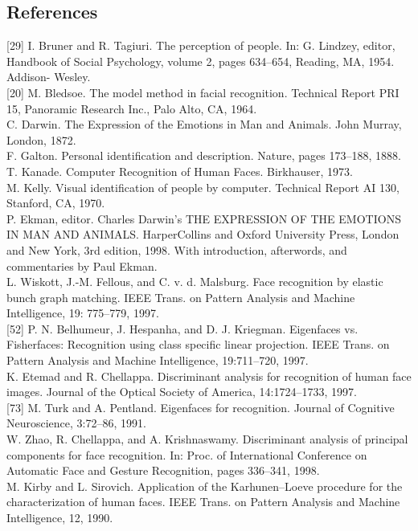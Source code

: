\documentclass[10pt,a4paper]{article}
\begin{document}
\subsection{References}
[29] I. Bruner and R. Tagiuri. The perception of people. In: G. Lindzey, editor, Handbook
of Social Psychology, volume 2, pages 634–654, Reading, MA, 1954. Addison-
Wesley.\\

[20] M. Bledsoe. The model method in facial recognition. Technical Report PRI 15,
Panoramic Research Inc., Palo Alto, CA, 1964.\\
[21] C. Darwin. The Expression of the Emotions in Man and Animals. John Murray,
London, 1872.\\
[22] F. Galton. Personal identification and description. Nature, pages 173–188, 1888.\\
[23] T. Kanade. Computer Recognition of Human Faces. Birkhauser, 1973.\\
[24] M. Kelly. Visual identification of people by computer. Technical Report AI 130,
Stanford, CA, 1970.\\
[30] P. Ekman, editor. Charles Darwin’s THE EXPRESSION OF THE EMOTIONS IN
MAN AND ANIMALS. HarperCollins and Oxford University Press, London and
New York, 3rd edition, 1998. With introduction, afterwords, and commentaries by
Paul Ekman.\\
[49] L. Wiskott, J.-M. Fellous, and C. v. d. Malsburg. Face recognition by elastic bunch
graph matching. IEEE Trans. on Pattern Analysis and Machine Intelligence, 19:
775–779, 1997.\\

[52] P. N. Belhumeur, J. Hespanha, and D. J. Kriegman. Eigenfaces vs. Fisherfaces:
Recognition using class specific linear projection. IEEE Trans. on Pattern Analysis
and Machine Intelligence, 19:711–720, 1997.\\
[56] K. Etemad and R. Chellappa. Discriminant analysis for recognition of human face
images. Journal of the Optical Society of America, 14:1724–1733, 1997.\\

[73] M. Turk and A. Pentland. Eigenfaces for recognition. Journal of Cognitive
Neuroscience, 3:72–86, 1991.\\
[79] W. Zhao, R. Chellappa, and A. Krishnaswamy. Discriminant analysis of principal
components for face recognition. In: Proc. of International Conference on Automatic
Face and Gesture Recognition, pages 336–341, 1998.\\
[122] M. Kirby and L. Sirovich. Application of the Karhunen–Loeve procedure for the
characterization of human faces. IEEE Trans. on Pattern Analysis and Machine
Intelligence, 12, 1990.\\
\end{document}
